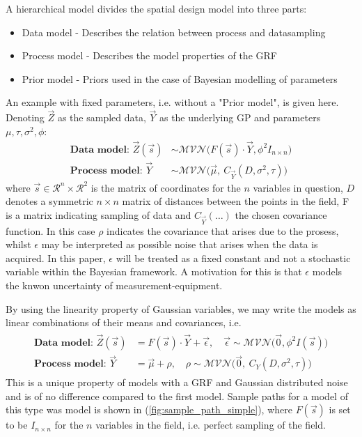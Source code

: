 A hierarchical model divides the spatial design model 
into three parts: 
\begin{itemize}
\item Data model - Describes the relation between process and datasampling
\item Process model - Describes the model properties of the GRF 
\item Prior model - Priors used in the case of Bayesian modelling of parameters
\end{itemize}


An example with fixed parameters, i.e. without a "Prior model", is given here. Denoting $\vec{Z}$ as the sampled data, $\vec{Y}$ as the underlying GP and parameters $\mu, \tau, \sigma^2, \phi$:
\begin{align*}
\textbf{Data model: } \vec{Z}(\vec{s}) &\sim \mathcal{MVN}\big(F(\vec{s}) \cdot \vec{Y},  \phi^2I_{n \times n}\big) \\
\textbf{Process model: } \vec{Y} &\sim \mathcal{MVN}\big( \vec{\mu}, \ C_{\vec{Y}} ( D, \sigma^2, \tau) \big)
\end{align*}
where $\vec{s} \in \mathcal{R}^n \times \mathcal{R}^2$ is the matrix of coordinates for the $n$ variables in question, $D$ denotes a symmetric $n \times n$ matrix of distances between the points in the field, F is a matrix indicating sampling of data and $C_{\vec{Y}}(\dots)$ the chosen covariance function. In this case $\rho$ indicates the covariance that arises due to the prosess, whilst $\epsilon$ may be interpreted as possible noise that arises when the data is acquired. In this paper, $\epsilon$ will be treated as a fixed constant and not a stochastic variable within the Bayesian framework. A motivation for this is that $\epsilon$ models the knwon uncertainty of measurement-equipment.

By using the linearity property of Gaussian variables, we may write the models as linear combinations of their means and covariances, i.e. 
\begin{align} \label{hm:linear_model}
\begin{split}
\textbf{Data model: } \vec{Z}(\vec{s}) &= F(\vec{s}) \cdot \vec{Y} + \vec{\epsilon}, \quad \vec{\epsilon} \sim \mathcal{MVN} \big(\vec{0},\phi^2I(\vec{s}) \big) \\
\textbf{Process model: } \vec{Y} &= \vec{\mu} + \rho, \quad \rho \sim \mathcal{MVN} \big(\vec{0}, \ C_Y(D, \sigma^2, \tau ) \big)
\end{split}
\end{align}
This is a unique property of models with a GRF and Gaussian distributed noise and is of no difference compared to the first model. Sample paths for a model of this type was model is shown in (\ref{fig:sample_path_simple}), where $F(\vec{s})$ is set to be $I_{n \times n}$ for the $n$ variables in the field, i.e. perfect sampling of the field.

